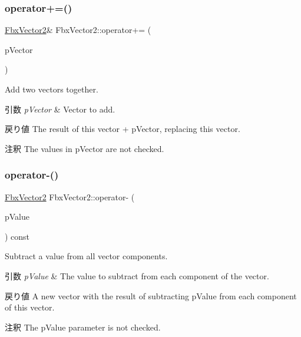 \subsubsection{\texorpdfstring{operator+=()}{operator+=()}\hspace{0.1cm}{\footnotesize\ttfamily [2/2]}}
{\footnotesize\ttfamily \hyperlink{class_fbx_vector2}{Fbx\+Vector2}\& Fbx\+Vector2\+::operator+= (\begin{DoxyParamCaption}\item[{const \hyperlink{class_fbx_vector2}{Fbx\+Vector2} \&}]{p\+Vector }\end{DoxyParamCaption})}

Add two vectors together. 
\begin{DoxyParams}{引数}
{\em p\+Vector} & Vector to add. \\
\hline
\end{DoxyParams}
\begin{DoxyReturn}{戻り値}
The result of this vector + p\+Vector, replacing this vector. 
\end{DoxyReturn}
\begin{DoxyRemark}{注釈}
The values in p\+Vector are not checked. 
\end{DoxyRemark}
\mbox{\label{class_fbx_vector2_a2eca389f246807837ecaea008e6a9ac0}} 
\subsubsection{\texorpdfstring{operator-\/()}{operator-()}\hspace{0.1cm}{\footnotesize\ttfamily [1/3]}}
{\footnotesize\ttfamily \hyperlink{class_fbx_vector2}{Fbx\+Vector2} Fbx\+Vector2\+::operator-\/ (\begin{DoxyParamCaption}\item[{double}]{p\+Value }\end{DoxyParamCaption}) const}

Subtract a value from all vector components. 
\begin{DoxyParams}{引数}
{\em p\+Value} & The value to subtract from each component of the vector. \\
\hline
\end{DoxyParams}
\begin{DoxyReturn}{戻り値}
A new vector with the result of subtracting p\+Value from each component of this vector. 
\end{DoxyReturn}
\begin{DoxyRemark}{注釈}
The p\+Value parameter is not checked. 
\end{DoxyRemark}
\mbox{\label{class_fbx_vector2_a4a135af7caa6377da57df7cd4cd1e06b}} 
